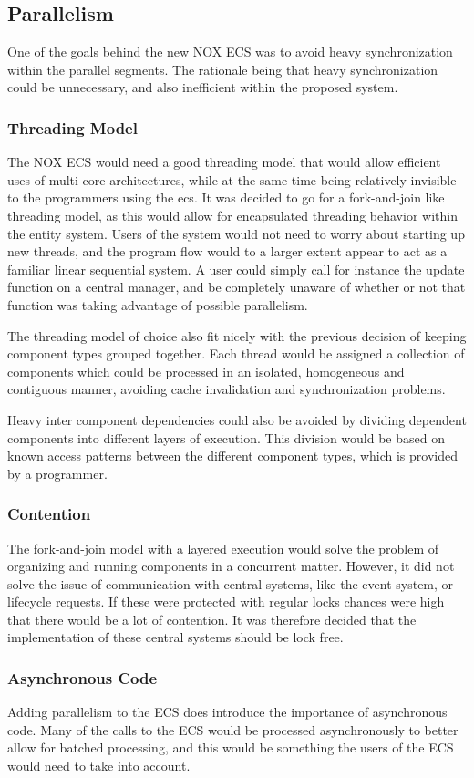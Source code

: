 \subsection{Parallelism}
One of the goals behind the new NOX ECS was to avoid heavy synchronization within the parallel segments.
The rationale being that heavy synchronization could be unnecessary, and also inefficient within the proposed system.

\subsubsection{Threading Model}
\label{subsubsec:high_level_threading_model}
The NOX ECS would need a good threading model that would allow efficient uses of multi-core
architectures, while at the same time being relatively invisible to the programmers
using the ecs.
It was decided to go for a fork-and-join like threading model\cite[p. 369]{game_engine_architecture},
as this would allow for encapsulated threading behavior within the entity system.
Users of the system would not need to worry about starting up new threads,
and the program flow would to a larger extent appear to act as a familiar linear sequential system.
A user could simply call for instance the update function on a central manager, and be completely
unaware of whether or not that function was taking advantage of possible parallelism.


The threading model of choice also fit nicely with the previous decision of keeping component types
grouped together.
Each thread would be assigned a collection of components which could be processed in an isolated,
homogeneous and contiguous manner, avoiding cache invalidation and synchronization problems.

Heavy inter component dependencies could also be avoided by dividing dependent components
into different layers of execution.
This division would be based on known access patterns between the different component types,
which is provided by a programmer.

\subsubsection{Contention}
The fork-and-join model with a layered execution would solve the problem of organizing and running components
in a concurrent matter.
However, it did not solve the issue of communication with central systems, like the event system, or lifecycle requests.
If these were protected with regular locks chances were high that there would be a lot of contention.
It was therefore decided that the implementation of these central systems should be lock free.

\subsubsection{Asynchronous Code}
Adding parallelism to the ECS does introduce the importance of asynchronous code.
Many of the calls to the ECS would be processed asynchronously to better allow for batched
processing, and this would be something the users of the ECS would need to take into account.
